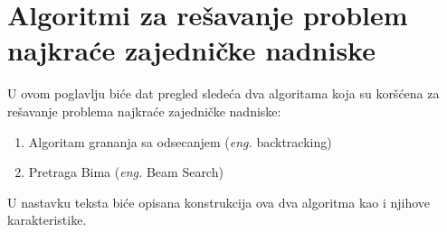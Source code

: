 \documentclass[12pt,oneside]{memoir}
\begin{document}

\chapter{Algoritmi za rešavanje problem najkraće zajedničke nadniske}
U ovom poglavlju biće dat pregled sledeća dva algoritama koja su koršćena za rešavanje problema najkraće zajedničke
nadniske:


\begin{enumerate}
  \item Algoritam grananja sa odsecanjem (\textit{eng.} backtracking)
  \item Pretraga Bima (\textit{eng.} Beam Search)
\end{enumerate}
U nastavku teksta biće opisana konstrukcija ova dva algoritma kao i njihove karakteristike.
\end{document}
